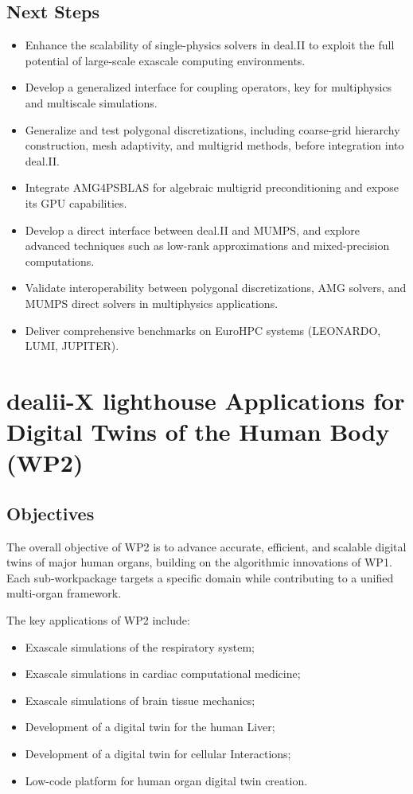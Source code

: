 \documentclass[a4paper,12pt, numbers]{article}
\begin{document}
\subsection{Next Steps} %
\begin{itemize}[left=1em, itemsep=0pt, topsep=0pt]
\item Enhance the scalability of single-physics solvers in deal.II to exploit the full potential of large-scale exascale computing environments.
\item Develop a generalized interface for coupling operators, key for multiphysics and multiscale simulations.

\item Generalize and test polygonal discretizations, including coarse-grid hierarchy construction, mesh adaptivity, and multigrid methods, before integration into deal.II.
\item Integrate AMG4PSBLAS for algebraic multigrid preconditioning and expose its GPU capabilities.
\item Develop a direct interface between deal.II and MUMPS, and explore advanced techniques such as low-rank approximations and mixed-precision computations.
\item Validate interoperability between polygonal discretizations, AMG solvers, and MUMPS direct solvers in multiphysics applications.
\item Deliver comprehensive benchmarks on EuroHPC systems (LEONARDO, LUMI, JUPITER).
\end{itemize}
\newpage

\section{{dealii-X lighthouse Applications for Digital Twins of the Human Body (WP2)}}
\label{sec:wp2_applications}


\subsection{Objectives}

The overall objective of WP2 is to advance accurate, efficient, and scalable digital twins of major human organs, building on the algorithmic innovations of WP1. Each sub-workpackage targets a specific domain while contributing to a unified multi-organ framework.

The key applications of WP2 include:
\begin{itemize}
\item Exascale simulations of the respiratory system;
\item Exascale simulations in cardiac computational medicine;
\item Exascale simulations of brain tissue mechanics;
\item Development of a digital twin for the human Liver;
\item Development of a digital twin for cellular Interactions;
\item Low-code platform for human organ digital twin creation.
\end{itemize}
\end{document}
